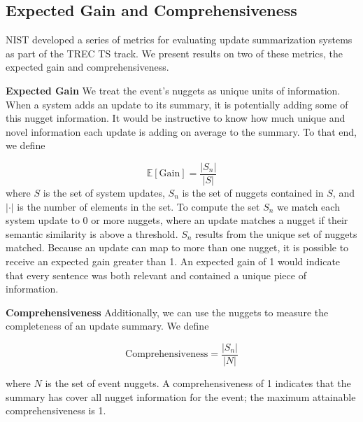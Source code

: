 \subsection{Expected Gain and Comprehensiveness}

NIST developed a series of metrics for evaluating update summarization systems
as part of the TREC TS track.
We present results on two of these metrics, the expected gain and 
comprehensiveness.

\textbf{Expected Gain } We treat the event's nuggets as unique units of 
information.
When a system adds an update to its summary, it is potentially adding some
of this nugget information. It would be instructive to know how much unique
and novel information each update is adding on average to the summary.
To that end, we define

\[ \mathrm{\mathbb{E}[Gain]} = \frac{|S_n|}{|S|}%
\] 
where $S$ is the set of system updates, 
$S_n$ is the set of nuggets contained in $S$, and $|\cdot|$ is the number of
elements in the set.
To compute the set $S_n$ we match each system update to 0 or more nuggets, 
where an update matches a nugget if their semantic similarity is above 
a threshold. $S_n$ results from the unique set of nuggets matched.
Because an update can map to more than one nugget, it is possible to receive an
expected gain greater than 1.
An expected gain of 1 would indicate that every
sentence was both relevant and contained a unique piece of information.



\textbf{Comprehensiveness } Additionally, we can use the nuggets to measure the completeness of an update 
summary. We define

\[ \mathrm{Comprehensiveness} = \frac{|S_n|}{|N|}\]

where $N$ is the set of event nuggets.
A comprehensiveness of 1 indicates that the summary has cover 
all nugget information for the event; the maximum
attainable comprehensiveness is 1.


